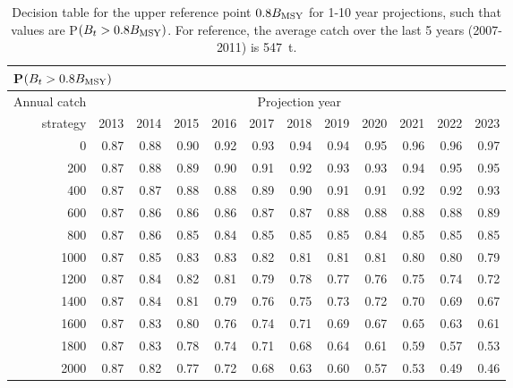 \begin{table}[tpb]
\begin{center}
\caption{Decision table for the upper reference point $0.8 B_\mathrm{MSY}$ for 1-10 year projections, such that values are P$(B_t > 0.8 B_\mathrm{MSY})$. For reference, the average catch over the last 5 years (2007-2011) is 547~t.}
\label{tab:URP10}
\begin{tabular}{rrrrrrrrrrrr}
\multicolumn{12}{l}{P$(B_t > 0.8 B_\mathrm{MSY})$} \\
\hline
Annual catch & \multicolumn{11}{c}{Projection year} \\
\cline{2-12}
strategy & 2013 & 2014 & 2015 & 2016 & 2017 & 2018 & 2019 & 2020 & 2021 & 2022 & 2023 \\ 
  \hline
0 & 0.87 & 0.88 & 0.90 & 0.92 & 0.93 & 0.94 & 0.94 & 0.95 & 0.96 & 0.96 & 0.97 \\ 
  200 & 0.87 & 0.88 & 0.89 & 0.90 & 0.91 & 0.92 & 0.93 & 0.93 & 0.94 & 0.95 & 0.95 \\ 
  400 & 0.87 & 0.87 & 0.88 & 0.88 & 0.89 & 0.90 & 0.91 & 0.91 & 0.92 & 0.92 & 0.93 \\ 
  600 & 0.87 & 0.86 & 0.86 & 0.86 & 0.87 & 0.87 & 0.88 & 0.88 & 0.88 & 0.88 & 0.89 \\ 
  800 & 0.87 & 0.86 & 0.85 & 0.84 & 0.85 & 0.85 & 0.85 & 0.84 & 0.85 & 0.85 & 0.85 \\ 
  1000 & 0.87 & 0.85 & 0.83 & 0.83 & 0.82 & 0.81 & 0.81 & 0.81 & 0.80 & 0.80 & 0.79 \\ 
  1200 & 0.87 & 0.84 & 0.82 & 0.81 & 0.79 & 0.78 & 0.77 & 0.76 & 0.75 & 0.74 & 0.72 \\ 
  1400 & 0.87 & 0.84 & 0.81 & 0.79 & 0.76 & 0.75 & 0.73 & 0.72 & 0.70 & 0.69 & 0.67 \\ 
  1600 & 0.87 & 0.83 & 0.80 & 0.76 & 0.74 & 0.71 & 0.69 & 0.67 & 0.65 & 0.63 & 0.61 \\ 
  1800 & 0.87 & 0.83 & 0.78 & 0.74 & 0.71 & 0.68 & 0.64 & 0.61 & 0.59 & 0.57 & 0.53 \\ 
  2000 & 0.87 & 0.82 & 0.77 & 0.72 & 0.68 & 0.63 & 0.60 & 0.57 & 0.53 & 0.49 & 0.46 \\ 
   \hline
\end{tabular}
\end{center}
\end{table}%
